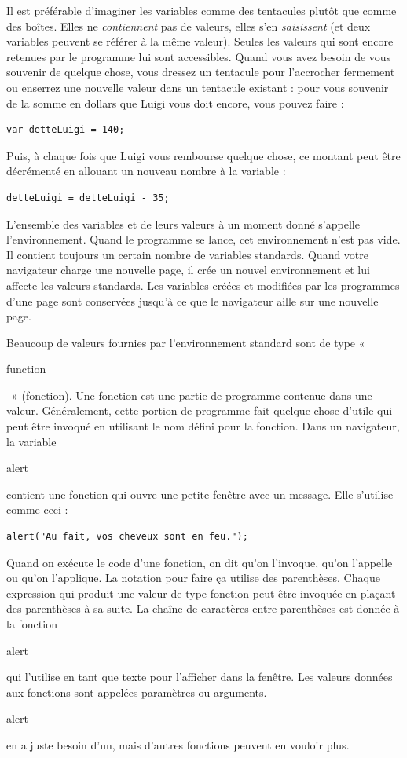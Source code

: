 \documentclass{FramateX}
\renewcommand{\texttt}[1]{\begin{sffamily}{#1}\end{sffamily}}
\begin{document}
Il est préférable d'imaginer les variables comme des tentacules plutôt
que comme des boîtes. Elles ne \emph{contiennent} pas de valeurs, elles
s'en \emph{saisissent} (et deux variables peuvent se référer à la même
valeur). Seules les valeurs qui sont encore retenues par le programme
lui sont accessibles. Quand vous avez besoin de vous souvenir de quelque
chose, vous dressez un tentacule pour l'accrocher fermement ou enserrez
une nouvelle valeur dans un tentacule existant : pour vous souvenir de
la somme en dollars que Luigi vous doit encore, vous pouvez faire :

\begin{lstlisting}
var detteLuigi = 140;
\end{lstlisting}
Puis, à chaque fois que Luigi vous rembourse quelque chose, ce montant
peut être décrémenté en allouant un nouveau nombre à la variable :

\begin{lstlisting}
detteLuigi = detteLuigi - 35;
\end{lstlisting}
L'ensemble des variables et de leurs valeurs à un moment donné s'appelle
l'environnement. Quand le programme se lance, cet environnement n'est
pas vide. Il contient toujours un certain nombre de variables standards.
Quand votre navigateur charge une nouvelle page, il crée un nouvel
environnement et lui affecte les valeurs standards. Les variables créées
et modifiées par les programmes d'une page sont conservées jusqu'à ce
que le navigateur aille sur une nouvelle page.

\begin{center}\end{center}

Beaucoup de valeurs fournies par l'environnement standard sont de type «
\texttt{function}~» (fonction). Une fonction est une partie de programme
contenue dans une valeur. Généralement, cette portion de programme fait
quelque chose d'utile qui peut être invoqué en utilisant le nom défini
pour la fonction. Dans un navigateur, la variable \texttt{alert}
contient une fonction qui ouvre une petite fenêtre avec un message. Elle
s'utilise comme ceci :

\begin{lstlisting}
alert("Au fait, vos cheveux sont en feu.");
\end{lstlisting}
Quand on exécute le code d'une fonction, on dit qu'on l'invoque, qu'on
l'appelle ou qu'on l'applique. La notation pour faire ça utilise des
parenthèses. Chaque expression qui produit une valeur de type fonction
peut être invoquée en plaçant des parenthèses à sa suite. La chaîne de
caractères entre parenthèses est donnée à la fonction \texttt{alert} qui
l'utilise en tant que texte pour l'afficher dans la fenêtre. Les valeurs
données aux fonctions sont appelées paramètres ou arguments.
\texttt{alert} en a juste besoin d'un, mais d'autres fonctions peuvent
en vouloir plus.
\end{document}
